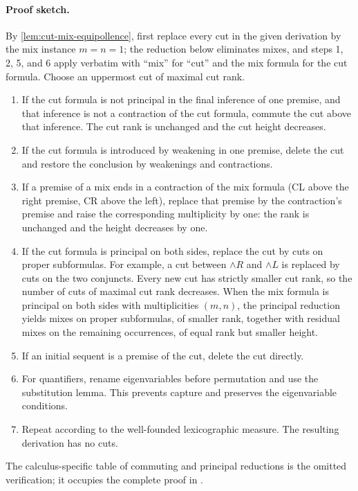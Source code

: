 \paragraph{Proof sketch.}
By \cref{lem:cut-mix-equipollence}, first replace every cut in the given
derivation by the mix instance \(m=n=1\); the reduction below eliminates
mixes, and steps 1, 2, 5, and 6 apply verbatim with ``mix'' for ``cut''
and the mix formula for the cut formula.
Choose an uppermost cut of maximal cut rank.
\begin{enumerate}
  \item If the cut formula is not principal in the final inference of one
        premise, and that inference is not a contraction of the cut formula,
        commute the cut above that inference.  The cut rank is
        unchanged and the cut height decreases.
  \item If the cut formula is introduced by weakening in one premise, delete
        the cut and restore the conclusion by weakenings and contractions.
  \item If a premise of a mix ends in a contraction of the mix formula
        (\textsc{CL} above the right premise, \textsc{CR} above the
        left), replace that premise by the contraction's premise and
        raise the corresponding multiplicity by one: the rank is
        unchanged and the height decreases by one.
  \item If the cut formula is principal on both sides, replace the cut by cuts
        on proper subformulas.  For example, a cut between \(\land R\) and
        \(\land L\) is replaced by cuts on the two conjuncts.  Every new cut
        has strictly smaller cut rank, so the number of cuts of maximal cut
        rank decreases.  When the mix formula is principal on both sides
        with multiplicities \((m,n)\), the principal reduction yields
        mixes on proper subformulas, of smaller rank, together with
        residual mixes on the remaining occurrences, of equal rank but
        smaller height.
  \item If an initial sequent is a premise of the cut, delete the cut directly.
  \item For quantifiers, rename eigenvariables before permutation and use the
        substitution lemma.  This prevents capture and preserves the
        eigenvariable conditions.
  \item Repeat according to the well-founded lexicographic measure.  The
        resulting derivation has no cuts.
\end{enumerate}
The calculus-specific table of commuting and principal reductions is the
omitted verification; it occupies the
complete proof in
\cite{TroelstraSchwichtenberg2000,NegriVonPlato2001}.

